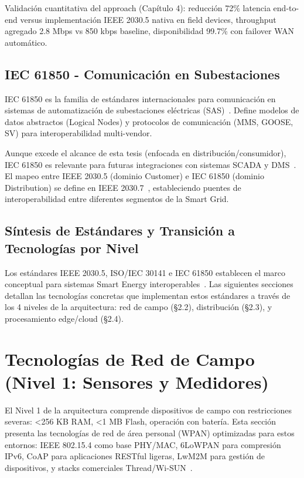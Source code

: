 Validación cuantitativa del approach (Capítulo 4): reducción 72\% latencia end-to-end versus implementación IEEE 2030.5 nativa en field devices, throughput agregado 2.8 Mbps vs 850 kbps baseline, disponibilidad 99.7\% con failover WAN automático.

\subsection{IEC 61850 - Comunicación en Subestaciones}

IEC 61850 es la familia de estándares internacionales para comunicación en sistemas de automatización de subestaciones eléctricas (SAS)~\cite{IEC618502020,basnetNetworkingPowerGrid2025}. Define modelos de datos abstractos (Logical Nodes) y protocolos de comunicación (MMS, GOOSE, SV) para interoperabilidad multi-vendor.

Aunque excede el alcance de esta tesis (enfocada en distribución/consumidor), IEC 61850 es relevante para futuras integraciones con sistemas SCADA y DMS~\cite{alsafranChallengesImplementingIoT2025}. El mapeo entre IEEE 2030.5 (dominio Customer) e IEC 61850 (dominio Distribution) se define en IEEE 2030.7~\cite{basnetNetworkingPowerGrid2025}, estableciendo puentes de interoperabilidad entre diferentes segmentos de la Smart Grid.

\subsection{Síntesis de Estándares y Transición a Tecnologías por Nivel}

Los estándares IEEE 2030.5, ISO/IEC 30141 e IEC 61850 establecen el marco conceptual para sistemas Smart Energy interoperables~\cite{IEEERecommendedPractice,tangResearchInteroperabilityIoT,basnetNetworkingPowerGrid2025}. Las siguientes secciones detallan las tecnologías concretas que implementan estos estándares a través de los 4 niveles de la arquitectura: red de campo (§2.2), distribución (§2.3), y procesamiento edge/cloud (§2.4).

\section{Tecnologías de Red de Campo (Nivel 1: Sensores y Medidores)}

El Nivel 1 de la arquitectura comprende dispositivos de campo con restricciones severas: <256 KB RAM, <1 MB Flash, operación con batería. Esta sección presenta las tecnologías de red de área personal (WPAN) optimizadas para estos entornos: IEEE 802.15.4 como base PHY/MAC, 6LoWPAN para compresión IPv6, CoAP para aplicaciones RESTful ligeras, LwM2M para gestión de dispositivos, y stacks comerciales Thread/Wi-SUN~\cite{shelby6LoWPANWirelessEmbedded2009,abdulsalamOverviewRecentWireless2024}.

